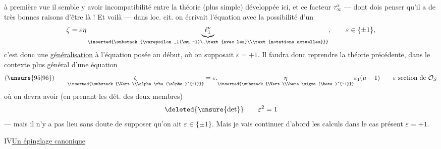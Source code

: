 à première vue il semble y avoir incompatibilité entre la théorie (plus simple) développée ici, et ce facteur $\tau_\infty^\alpha$ --- dont  dois penser qu'il a de très bonnes raisons d'être là ! Et voilà --- dans loc. cit. on écrivait l'équation   avec la possibilité d'un 
\[
\zeta=\varepsilon\eta
\underbrace{\ell_1^\nu}_{\inserted{\substack{\varepsilon_1(\mu-1)\ \text{avec les}\\\text{notations actuelles}}}},
\qquad\varepsilon\in\{\pm1\},
\]
c'est donc une \uline{généralisation}  à l'équation posée au début, où on supposait $\varepsilon=+1$.
Il faudra donc  reprendre la théorie précédente, dans le contexte plus général d'une équation
\[
(\unsure{95|96})\qquad
\underset{\inserted{\substack{\Vert\\\alpha\rho(\alpha)^{-1}}}}{\zeta}
=\varepsilon.\underset{\inserted{\substack{\Vert\\\beta\sigma(\beta)^{-1}}}}{\eta}\varepsilon_1(\mu-1)
\qquad\varepsilon\ \text{section de }\mathcal O_S
\]
où on devra avoir (en prenant les dét. des deux membres) 
\[
\deleted{\unsure{\det}}\qquad\varepsilon^2=1
\]
--- mais il n'y a pas lieu sans doute de supposer qu'on ait $\varepsilon\in\{\pm1\}$. Mais je vais continuer d'abord les calculs dans le cas présent $\varepsilon=+1$.



\uline{$\overline{\mathrm{IV}}$}\qquad\uline{Un épinglage canonique}

